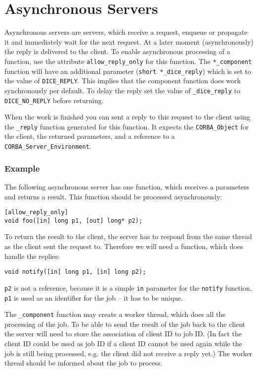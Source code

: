 \section{Asynchronous Servers}
\label{sec:asynchronous}
Asynchronous servers are servers, which receive a request, enqueue or
propagate it and immediately wait for the next request. At a later 
moment (asynchronously) the reply is delivered to the client. To
enable asynchronous processing of a function, use the attribute 
\verb|allow_reply_only| for this function. The \verb|*_component| function
will have an additional parameter (\verb|short *_dice_reply|) which is
set to the value of \verb|DICE_REPLY|. This implies that the component
function does work synchronously per default. To delay the reply
set the value of \verb|_dice_reply| to \verb|DICE_NO_REPLY| before
returning.

When the work is finished you can sent a reply to this request to 
the client using the \verb|_reply| function generated for this
function. It expects the \verb|CORBA_Object| for the client, the
returned parameters, and a reference to a \verb|CORBA_Server_Environment|.

\subsubsection{Example}
The following asynchronous server has one function, which receives a
parameters and returns a result. This function should be processed
asynchronously:

\begin{verbatim}
[allow_reply_only]
void foo([in] long p1, [out] long* p2);
\end{verbatim}

To return the result to the client, the server has to respond from the same
thread as the client sent the request to. Therefore we will need a
function, which does handle the replies:

\begin{verbatim}
void notify([in] long p1, [in] long p2);
\end{verbatim}

\verb|p2| is not a reference, because it is a simple \verb|in| parameter
for the \verb|notify| function. \verb|p1| is used as an identifier for the
job -- it has to be unique.

The \verb|_component| function may create a worker thread, which does all the
processing of the job. To be able to send the result of the job back to the
client the server will need to store the association of client ID to job ID.
(In fact the client ID could be used as job ID if a client ID cannot be
used again while the job is still being processed, e.g. the client did not
receive a reply yet.) The worker thread should be informed about the job to 
process. 

